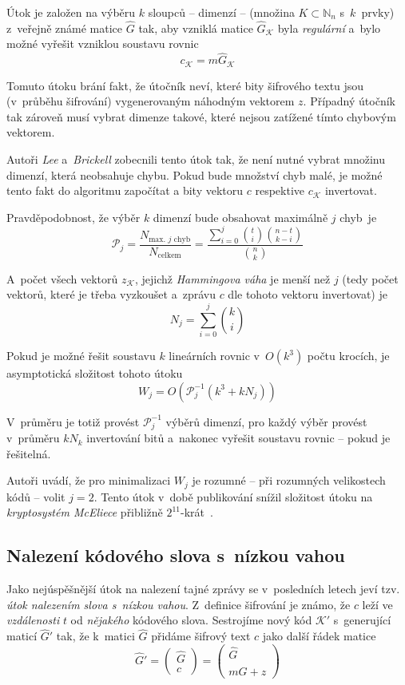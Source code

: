 \documentclass[thesis=M,czech,hidelinks]{FITthesis}[2012/06/26]
\newcommand{\0}{{\textcolor[gray]{0.75}{0}}}
\begin{document}
Útok je založen na výběru $k$ sloupců -- dimenzí -- (množina
$K\subset\mathbb{N}_n$ s~$k$~prvky) z~veřejně známé matice $\hat{G}$ tak, aby
vzniklá matice $\hat{G}_{\mathcal{K}}$ byla \emph{regulární} a~bylo možné
vyřešit vzniklou soustavu rovnic
$$ c_{\mathcal{K}} = m \hat{G}_{\mathcal{K}} $$

Tomuto útoku brání fakt, že útočník neví, které bity šifrového textu jsou
(v~průběhu šifrování)  vygenerovaným náhodným vektorem $z$.
Případný útočník tak zároveň musí vybrat dimenze takové, které nejsou zatížené
tímto chybovým vektorem.

Autoři \emph{Lee} a~\emph{Brickell} zobecnili tento útok tak, že není nutné
vybrat množinu dimenzí, která neobsahuje chybu. Pokud bude množství chyb malé,
je možné tento fakt do algoritmu započítat a bity vektoru $c$ respektive
$c_{\mathcal{K}}$ invertovat.

Pravděpodobnost, že výběr $k$ dimenzí bude obsahovat maximálně $j$ chyb~je
$$
    \mathcal{P}_j= \frac{N_{\text{max. $j$ chyb}}}{N_{\text{celkem}}}
    = \frac{\sum_{i=0}^{j}\binom{t}{i}\binom{n-t}{k-i}}{\binom{n}{k}}
$$

A~počet všech vektorů $z_\mathcal{K}$, jejichž \emph{Hammingova váha} je menší
než $j$ (tedy počet vektorů, které je třeba vyzkoušet a~zprávu $c$ dle tohoto
vektoru invertovat) je
$$ N_j = \sum_{i=0}^{j}\binom{k}{i} $$

Pokud je možné řešit soustavu $k$ lineárních rovnic v~$O(k^3)$ počtu krocích, je
asymptotická složitost tohoto útoku
$$ W_j = O\left( \mathcal{P}_{j}^{-1}\left(k^3 + k N_j \right) \right) $$

V~průměru je totiž provést $\mathcal{P}_{j}^{-1}$ výběrů dimenzí, pro každý
výběr provést v~průměru $k N_k$ invertování bitů a~nakonec vyřešit soustavu
rovnic -- pokud je řešitelná.

Autoři uvádí, že pro minimalizaci $W_j$ je rozumné -- při rozumných velikostech
kódů -- volit $j=2$. Tento útok v~době publikování snížil složitost útoku na
\emph{kryptosystém McEliece} přibližně $2^11$-krát~\cite{Lee}.


\subsection{Nalezení kódového slova s~nízkou vahou}

Jako nejúspěšnější útok na nalezení tajné zprávy se v~posledních letech jeví
tzv. \emph{útok nalezením slova s~nízkou vahou}. Z~definice šifrování je známo,
že $c$ leží ve \emph{vzdálenosti} $t$ od \emph{nějakého} kódového slova.
Sestrojíme nový kód $\mathcal{K}'$ s~generující maticí $\hat{G}'$ tak, že
k~matici $\hat{G}$ přidáme šifrový text $c$ jako další řádek matice
$$
    \hat{G}' = \left(\begin{array}{c}
        \hat{G} \\
        c
    \end{array}\right) = \left(\begin{array}{c}
        \hat{G} \\
        m\hat{G} + z
    \end{array}\right)
$$
\end{document}
